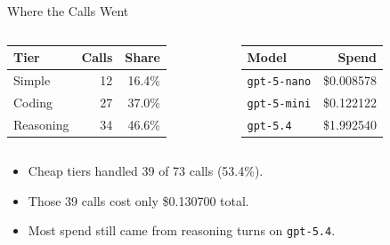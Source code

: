 \documentclass[aspectratio=169]{beamer}
\begin{document}
\begin{frame}{Where the Calls Went}
  \begin{columns}[T]
    \begin{table}
      \centering
      \begin{tabular}{lrr}
        \toprule
        Tier & Calls & Share \\
        \midrule
        Simple & 12 & 16.4\% \\
        Coding & 27 & 37.0\% \\
        Reasoning & 34 & 46.6\% \\
        \bottomrule
      \end{tabular}
    \end{table}

    \begin{table}
      \centering
      \begin{tabular}{lr}
        \toprule
        Model & Spend \\
        \midrule
        \texttt{gpt-5-nano} & \$0.008578 \\
        \texttt{gpt-5-mini} & \$0.122122 \\
        \texttt{gpt-5.4} & \$1.992540 \\
        \bottomrule
      \end{tabular}
    \end{table}
  \end{columns}

  \vspace{0.5em}

  \begin{itemize}
    \item Cheap tiers handled 39 of 73 calls (53.4\%).
    \item Those 39 calls cost only \$0.130700 total.
    \item Most spend still came from reasoning turns on \texttt{gpt-5.4}.
  \end{itemize}
\end{frame}
\end{document}
